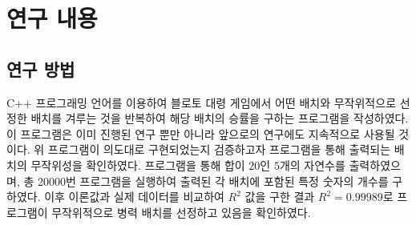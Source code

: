 \section{연구 내용}
\subsection{연구 방법}
C++ 프로그래밍 언어를 이용하여 블로토 대령 게임에서 어떤 배치와 무작위적으로 선정한 배치를 겨루는 것을 반복하여 해당 배치의 승률을 구하는 프로그램을 작성하였다. 이 프로그램은 이미 진행된 연구 뿐만 아니라 앞으로의 연구에도 지속적으로 사용될 것이다. 위 프로그램이 의도대로 구현되었는지 검증하고자 프로그램을 통해 출력되는 배치의 무작위성을 확인하였다. 프로그램을 통해 합이 $20$인 $5$개의 자연수를 출력하였으며, 총 20000번 프로그램을 실행하여 출력된 각 배치에 포함된 특정 숫자의 개수를 구하였다. 이후 이론값과 실제 데이터를 비교하여 $R^2$ 값을 구한 결과 $R^2=0.99989$로 프로그램이 무작위적으로 병력 배치를 선정하고 있음을 확인하였다.
